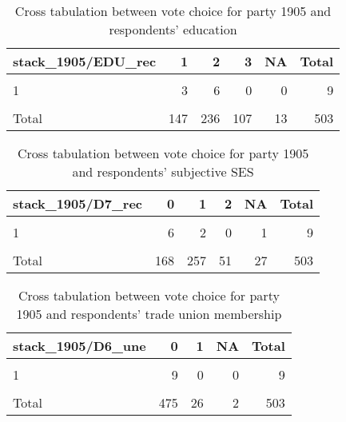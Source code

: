 \documentclass[
]{article}
\begin{document}
\begin{table}

\caption{\label{tab:unnamed-chunk-126}Cross tabulation between vote choice for party 1905 and respondents' education 
                   \label{table:crosstab_5_2_mt}}
\centering
\begin{tabular}[t]{l|r|r|r|r|r}
\hline
stack\_1905/EDU\_rec & 1 & 2 & 3 & NA & Total\\
\hline
\cellcolor{gray!6}{0} & \cellcolor{gray!6}{111} & \cellcolor{gray!6}{169} & \cellcolor{gray!6}{76} & \cellcolor{gray!6}{12} & \cellcolor{gray!6}{368}\\
\hline
1 & 3 & 6 & 0 & 0 & 9\\
\hline
\cellcolor{gray!6}{NA} & \cellcolor{gray!6}{33} & \cellcolor{gray!6}{61} & \cellcolor{gray!6}{31} & \cellcolor{gray!6}{1} & \cellcolor{gray!6}{126}\\
\hline
Total & 147 & 236 & 107 & 13 & 503\\
\hline
\end{tabular}
\end{table}

\begin{table}

\caption{\label{tab:unnamed-chunk-126}Cross tabulation between vote choice for party 1905 and respondents' subjective SES 
                   \label{table:crosstab_5_3_mt}}
\centering
\begin{tabular}[t]{l|r|r|r|r|r}
\hline
stack\_1905/D7\_rec & 0 & 1 & 2 & NA & Total\\
\hline
\cellcolor{gray!6}{0} & \cellcolor{gray!6}{122} & \cellcolor{gray!6}{195} & \cellcolor{gray!6}{38} & \cellcolor{gray!6}{13} & \cellcolor{gray!6}{368}\\
\hline
1 & 6 & 2 & 0 & 1 & 9\\
\hline
\cellcolor{gray!6}{NA} & \cellcolor{gray!6}{40} & \cellcolor{gray!6}{60} & \cellcolor{gray!6}{13} & \cellcolor{gray!6}{13} & \cellcolor{gray!6}{126}\\
\hline
Total & 168 & 257 & 51 & 27 & 503\\
\hline
\end{tabular}
\end{table}

\begin{table}

\caption{\label{tab:unnamed-chunk-126}Cross tabulation between vote choice for party 1905 and respondents' trade union 
                   membership \label{table:crosstab_5_4_mt}}
\centering
\begin{tabular}[t]{l|r|r|r|r}
\hline
stack\_1905/D6\_une & 0 & 1 & NA & Total\\
\hline
\cellcolor{gray!6}{0} & \cellcolor{gray!6}{349} & \cellcolor{gray!6}{17} & \cellcolor{gray!6}{2} & \cellcolor{gray!6}{368}\\
\hline
1 & 9 & 0 & 0 & 9\\
\hline
\cellcolor{gray!6}{NA} & \cellcolor{gray!6}{117} & \cellcolor{gray!6}{9} & \cellcolor{gray!6}{0} & \cellcolor{gray!6}{126}\\
\hline
Total & 475 & 26 & 2 & 503\\
\hline
\end{tabular}
\end{table}
\end{document}
